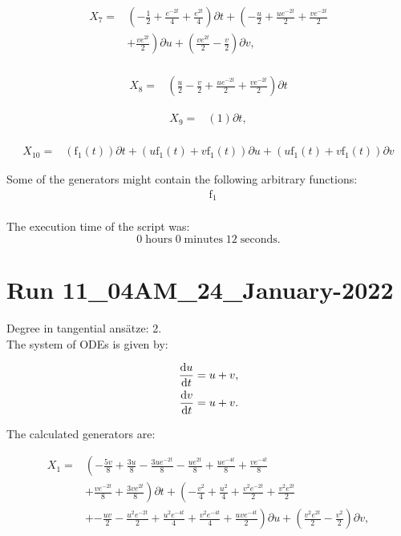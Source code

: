 \begin{align*}
X_{7}=&\left(- \frac{1}{2}+\frac{e^{- 2 t}}{4}+\frac{e^{2 t}}{4} \right)\partial t+\left(- \frac{u}{2}+\frac{u e^{- 2 t}}{2}+\frac{v e^{- 2 t}}{2}\right.\\
&+\left.\frac{v e^{2 t}}{2} \right)\partial u+\left(\frac{v e^{2 t}}{2} - \frac{v}{2} \right)\partial v,\\
\end{align*}

\begin{align*}
X_{8}=&\left(\frac{u}{2}- \frac{v}{2}+\frac{u e^{- 2 t}}{2}+\frac{v e^{- 2 t}}{2} \right)\partial t
\end{align*}

\begin{align*}
X_{9}=&\left(1 \right)\partial t,\\
\end{align*}

\begin{align*}
X_{10}=&\left(\operatorname{f_{1}}{\left(t \right)} \right)\partial t+\left(u \operatorname{f_{1}}{\left(t \right)}+v \operatorname{f_{1}}{\left(t \right)} \right)\partial u+\left(u \operatorname{f_{1}}{\left(t \right)}+v \operatorname{f_{1}}{\left(t \right)} \right)\partial v
\end{align*}



\noindent Some of the generators might contain the following arbitrary functions:
\begin{align*}
&\operatorname{f_{1}}\\
\end{align*}

\noindent The execution time of the script was:
$$0\;\mathrm{hours}\;0\;\mathrm{minutes}\;12 \;\mathrm{seconds}.$$
\section*{Run 11\_04AM\_24\_January-2022}
Degree in tangential ansätze:	2.\\
The system of ODEs is given by:

\begin{align*}
\dv{u}{t}&=u + v,\\
\dv{v}{t}&=u + v.\\
\end{align*}

\noindent The calculated generators are:

\begin{align*}
X_{1}=&\left(- \frac{5 v}{8}+\frac{3 u}{8}- \frac{3 u e^{- 2 t}}{8}- \frac{u e^{2 t}}{8}+\frac{u e^{- 4 t}}{8}+\frac{v e^{- 4 t}}{8}\right.\\
&+\left.\frac{v e^{- 2 t}}{8}+\frac{3 v e^{2 t}}{8} \right)\partial t+\left(- \frac{v^{2}}{4}+\frac{u^{2}}{4}+\frac{v^{2} e^{- 2 t}}{2}+\frac{v^{2} e^{2 t}}{2}\right.\\
&+\left.- \frac{u v}{2}- \frac{u^{2} e^{- 2 t}}{2}+\frac{u^{2} e^{- 4 t}}{4}+\frac{v^{2} e^{- 4 t}}{4}+\frac{u v e^{- 4 t}}{2} \right)\partial u+\left(\frac{v^{2} e^{2 t}}{2} - \frac{v^{2}}{2} \right)\partial v,\\
\end{align*}

